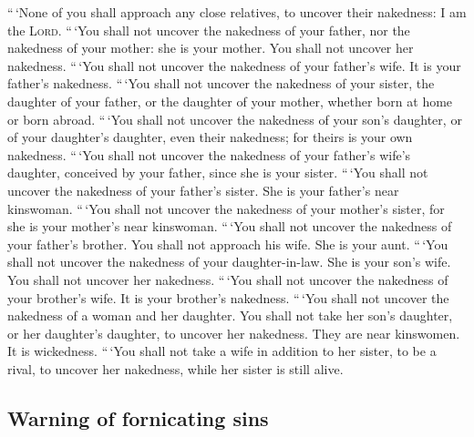  ``\,`None of you shall approach any close relatives, to
uncover their nakedness: I am the \textsc{Lord}.  ``\,`You
shall not uncover the nakedness of your father, nor the nakedness of
your mother: she is your mother. You shall not uncover her nakedness.
 ``\,`You shall not uncover the nakedness of your father's
wife. It is your father's nakedness.  ``\,`You shall not
uncover the nakedness of your sister, the daughter of your father, or
the daughter of your mother, whether born at home or born abroad.
 ``\,`You shall not uncover the nakedness of your son's
daughter, or of your daughter's daughter, even their nakedness; for
theirs is your own nakedness.  ``\,`You shall not uncover
the nakedness of your father's wife's daughter, conceived by your
father, since she is your sister.  ``\,`You shall not
uncover the nakedness of your father's sister. She is your father's near
kinswoman.  ``\,`You shall not uncover the nakedness of
your mother's sister, for she is your mother's near kinswoman.
 ``\,`You shall not uncover the nakedness of your
father's brother. You shall not approach his wife. She is your aunt.
 ``\,`You shall not uncover the nakedness of your
daughter-in-law. She is your son's wife. You shall not uncover her
nakedness.  ``\,`You shall not uncover the nakedness of
your brother's wife. It is your brother's nakedness. 
``\,`You shall not uncover the nakedness of a woman and her daughter.
You shall not take her son's daughter, or her daughter's daughter, to
uncover her nakedness. They are near kinswomen. It is wickedness.
 ``\,`You shall not take a wife in addition to her
sister, to be a rival, to uncover her nakedness, while her sister is
still alive.

\hypertarget{warning-of-fornicating-sins}{%
\subsection{Warning of fornicating
sins}\label{warning-of-fornicating-sins}}

